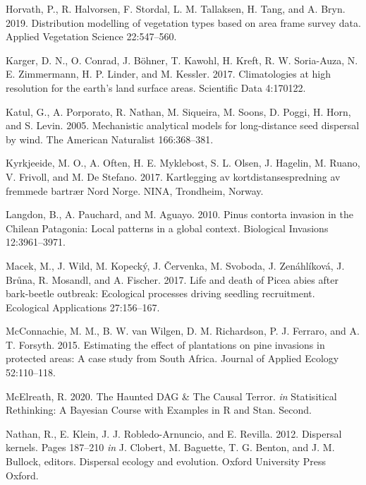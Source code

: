 \documentclass[
]{article}
\begin{document}
\leavevmode\hypertarget{ref-horvathDistributionModellingVegetation2019}{}%
Horvath, P., R. Halvorsen, F. Stordal, L. M. Tallaksen, H. Tang, and A. Bryn. 2019. Distribution modelling of vegetation types based on area frame survey data. Applied Vegetation Science 22:547--560.

\leavevmode\hypertarget{ref-kargerClimatologiesHighResolution2017}{}%
Karger, D. N., O. Conrad, J. Böhner, T. Kawohl, H. Kreft, R. W. Soria-Auza, N. E. Zimmermann, H. P. Linder, and M. Kessler. 2017. Climatologies at high resolution for the earth's land surface areas. Scientific Data 4:170122.

\leavevmode\hypertarget{ref-katulMechanisticAnalyticalModels2005}{}%
Katul, G., A. Porporato, R. Nathan, M. Siqueira, M. Soons, D. Poggi, H. Horn, and S. Levin. 2005. Mechanistic analytical models for long-distance seed dispersal by wind. The American Naturalist 166:368--381.

\leavevmode\hypertarget{ref-kyrkjeeideKartleggingAvKortdistansespredning2017}{}%
Kyrkjeeide, M. O., A. Often, H. E. Myklebost, S. L. Olsen, J. Hagelin, M. Ruano, V. Frivoll, and M. De Stefano. 2017. Kartlegging av kortdistansespredning av fremmede bartrær Nord Norge. NINA, Trondheim, Norway.

\leavevmode\hypertarget{ref-langdonPinusContortaInvasion2010}{}%
Langdon, B., A. Pauchard, and M. Aguayo. 2010. Pinus contorta invasion in the Chilean Patagonia: Local patterns in a global context. Biological Invasions 12:3961--3971.

\leavevmode\hypertarget{ref-macekLifeDeathPicea2017}{}%
Macek, M., J. Wild, M. Kopecký, J. Červenka, M. Svoboda, J. Zenáhlíková, J. Brůna, R. Mosandl, and A. Fischer. 2017. Life and death of Picea abies after bark-beetle outbreak: Ecological processes driving seedling recruitment. Ecological Applications 27:156--167.

\leavevmode\hypertarget{ref-mcconnachieEstimatingEffectPlantations2015}{}%
McConnachie, M. M., B. W. van Wilgen, D. M. Richardson, P. J. Ferraro, and A. T. Forsyth. 2015. Estimating the effect of plantations on pine invasions in protected areas: A case study from South Africa. Journal of Applied Ecology 52:110--118.

\leavevmode\hypertarget{ref-mcelreathHauntedDAGCausal2020}{}%
McElreath, R. 2020. The Haunted DAG \& The Causal Terror. \emph{in} Statisitical Rethinking: A Bayesian Course with Examples in R and Stan. Second.

\leavevmode\hypertarget{ref-nathanDispersalKernels2012}{}%
Nathan, R., E. Klein, J. J. Robledo-Arnuncio, and E. Revilla. 2012. Dispersal kernels. Pages 187--210 \emph{in} J. Clobert, M. Baguette, T. G. Benton, and J. M. Bullock, editors. Dispersal ecology and evolution. Oxford University Press Oxford.
\end{document}
